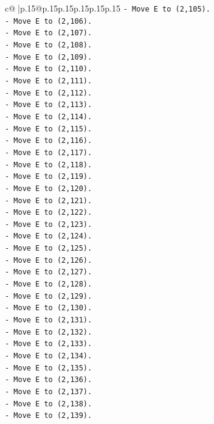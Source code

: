 \documentclass{article}
\begin{document}
{\begin{supertabular}{c@{$\;$}|p{.15\linewidth}@{}p{.15\linewidth}p{.15\linewidth}p{.15\linewidth}p{.15\linewidth}p{.15\linewidth}}
{{{\texttt{{-} Move E to (2,105).} \\
\texttt{{-} Move E to (2,106).} \\
\texttt{{-} Move E to (2,107).} \\
\texttt{{-} Move E to (2,108).} \\
\texttt{{-} Move E to (2,109).} \\
\texttt{{-} Move E to (2,110).} \\
\texttt{{-} Move E to (2,111).} \\
\texttt{{-} Move E to (2,112).} \\
\texttt{{-} Move E to (2,113).} \\
\texttt{{-} Move E to (2,114).} \\
\texttt{{-} Move E to (2,115).} \\
\texttt{{-} Move E to (2,116).} \\
\texttt{{-} Move E to (2,117).} \\
\texttt{{-} Move E to (2,118).} \\
\texttt{{-} Move E to (2,119).} \\
\texttt{{-} Move E to (2,120).} \\
\texttt{{-} Move E to (2,121).} \\
\texttt{{-} Move E to (2,122).} \\
\texttt{{-} Move E to (2,123).} \\
\texttt{{-} Move E to (2,124).} \\
\texttt{{-} Move E to (2,125).} \\
\texttt{{-} Move E to (2,126).} \\
\texttt{{-} Move E to (2,127).} \\
\texttt{{-} Move E to (2,128).} \\
\texttt{{-} Move E to (2,129).} \\
\texttt{{-} Move E to (2,130).} \\
\texttt{{-} Move E to (2,131).} \\
\texttt{{-} Move E to (2,132).} \\
\texttt{{-} Move E to (2,133).} \\
\texttt{{-} Move E to (2,134).} \\
\texttt{{-} Move E to (2,135).} \\
\texttt{{-} Move E to (2,136).} \\
\texttt{{-} Move E to (2,137).} \\
\texttt{{-} Move E to (2,138).} \\
\texttt{{-} Move E to (2,139).} \\
}}}
\end{supertabular}}
\end{document}
